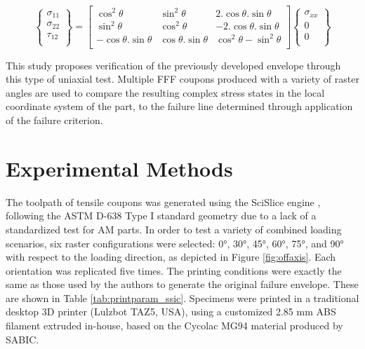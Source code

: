 \documentclass[main.tex]{subfiles}
\begin{document}
\begin{equation} \label{eq:comp_matrix}
	\left\{\begin{matrix}\sigma_{11}\\\sigma_{22}\\\tau_{12}\\\end{matrix}\right\}=\left[\begin{matrix}\cos^2{\theta}&\sin^2{\theta}&2.\cos{\theta.\sin{\theta}}\\\sin^2{\theta}&\cos^2{\theta}&-2.\cos{\theta.\sin{\theta}}\\-\cos{\theta.\sin{\theta}}&\cos{\theta.\sin{\theta}}&\cos^2{\theta-\sin^2{\theta}}\\\end{matrix}\right]\left\{\begin{matrix}\sigma_{xx}\\0\\0\\\end{matrix}\right\}
\end{equation}

This study proposes verification of the previously developed envelope through this type of uniaxial test. Multiple FFF coupons produced with a variety of raster angles are used to compare the resulting complex stress states in the local coordinate system of the part, to the failure line determined through application of the failure criterion.

\section{Experimental Methods} \label{sec:exmet_ssic}

The toolpath of tensile coupons was generated using the SciSlice engine \cite{VanHulle2017a}, following the ASTM D-638 Type I standard geometry \cite{ASTMD638} due to a lack of a standardized test for AM parts. In order to test a variety of combined loading scenarios, six raster configurations were selected: 0°, 30°, 45°, 60°, 75°, and 90° with respect to the loading direction, as depicted in Figure \ref{fig:offaxis}. Each orientation was replicated five times. The printing conditions were exactly the same as those used by the authors to generate the original failure envelope. These are shown in Table \ref{tab:printparam_ssic}. Specimens were printed in a traditional desktop 3D printer (Lulzbot TAZ5, USA), using a customized 2.85 mm ABS filament extruded in-house, based on the Cycolac MG94 material produced by SABIC.
\end{document}
